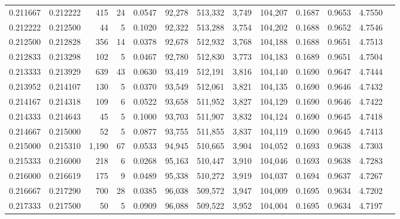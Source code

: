 \begin{tabular}{rrrrrrrrrrrrr}
0.211667 & 0.212222 &   415 &  24 &                                     0.0547 &  92,278 & 513,332 &   3,749 & 104,207 & 0.1687 & 0.9653 & 4.7550 \\
0.212222 & 0.212500 &    44 &   5 &                                     0.1020 &  92,322 & 513,288 &   3,754 & 104,202 & 0.1688 & 0.9652 & 4.7546 \\
0.212500 & 0.212828 &   356 &  14 &                                     0.0378 &  92,678 & 512,932 &   3,768 & 104,188 & 0.1688 & 0.9651 & 4.7513 \\
0.212833 & 0.213298 &   102 &   5 &                                     0.0467 &  92,780 & 512,830 &   3,773 & 104,183 & 0.1689 & 0.9651 & 4.7504 \\
0.213333 & 0.213929 &   639 &  43 &                                     0.0630 &  93,419 & 512,191 &   3,816 & 104,140 & 0.1690 & 0.9647 & 4.7444 \\
0.213952 & 0.214107 &   130 &   5 &                                     0.0370 &  93,549 & 512,061 &   3,821 & 104,135 & 0.1690 & 0.9646 & 4.7432 \\
0.214167 & 0.214318 &   109 &   6 &                                     0.0522 &  93,658 & 511,952 &   3,827 & 104,129 & 0.1690 & 0.9646 & 4.7422 \\
0.214333 & 0.214643 &    45 &   5 &                                     0.1000 &  93,703 & 511,907 &   3,832 & 104,124 & 0.1690 & 0.9645 & 4.7418 \\
0.214667 & 0.215000 &    52 &   5 &                                     0.0877 &  93,755 & 511,855 &   3,837 & 104,119 & 0.1690 & 0.9645 & 4.7413 \\
0.215000 & 0.215310 & 1,190 &  67 &                                     0.0533 &  94,945 & 510,665 &   3,904 & 104,052 & 0.1693 & 0.9638 & 4.7303 \\
0.215333 & 0.216000 &   218 &   6 &                                     0.0268 &  95,163 & 510,447 &   3,910 & 104,046 & 0.1693 & 0.9638 & 4.7283 \\
0.216000 & 0.216619 &   175 &   9 &                                     0.0489 &  95,338 & 510,272 &   3,919 & 104,037 & 0.1694 & 0.9637 & 4.7267 \\
0.216667 & 0.217290 &   700 &  28 &                                     0.0385 &  96,038 & 509,572 &   3,947 & 104,009 & 0.1695 & 0.9634 & 4.7202 \\
0.217333 & 0.217500 &    50 &   5 &                                     0.0909 &  96,088 & 509,522 &   3,952 & 104,004 & 0.1695 & 0.9634 & 4.7197 \\

\end{tabular}
